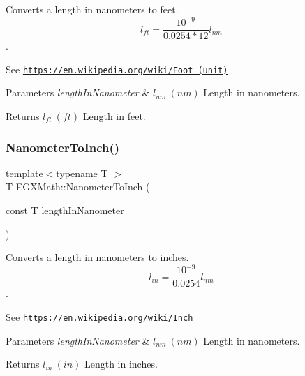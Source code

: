 Converts a length in nanometers to feet. \[ l_{ft}= \frac{10^{-9}}{0.0254 * 12} l_{nm} \]. 

See \href{https://en.wikipedia.org/wiki/Foot_(unit)}{\tt https\+://en.\+wikipedia.\+org/wiki/\+Foot\+\_\+(unit)} 
\begin{DoxyParams}{Parameters}
{\em length\+In\+Nanometer} & $ l_{nm}\ (nm)$ Length in nanometers. \\
\hline
\end{DoxyParams}
\begin{DoxyReturn}{Returns}
$ l_{ft}\ (ft)$ Length in feet. 
\end{DoxyReturn}
\mbox{\label{group___e_g_x_math-_conversions-_length_conversions-_s_i-_nanometer-_imperial_ga8b72dde5616da5be31e8054f1facc501}} 
\subsubsection{\texorpdfstring{Nanometer\+To\+Inch()}{NanometerToInch()}}
{\footnotesize\ttfamily template$<$typename T $>$ \\
T E\+G\+X\+Math\+::\+Nanometer\+To\+Inch (\begin{DoxyParamCaption}\item[{const T}]{length\+In\+Nanometer }\end{DoxyParamCaption})}



Converts a length in nanometers to inches. \[ l_{in}= \frac{10^{-9}}{0.0254} l_{nm} \]. 

See \href{https://en.wikipedia.org/wiki/Inch}{\tt https\+://en.\+wikipedia.\+org/wiki/\+Inch} 
\begin{DoxyParams}{Parameters}
{\em length\+In\+Nanometer} & $ l_{nm}\ (nm)$ Length in nanometers. \\
\hline
\end{DoxyParams}
\begin{DoxyReturn}{Returns}
$ l_{in}\ (in)$ Length in inches. 
\end{DoxyReturn}
\mbox{\label{group___e_g_x_math-_conversions-_length_conversions-_s_i-_nanometer-_imperial_gacfd62a86ae9a5085569840f3b7bbdb3e}} 
